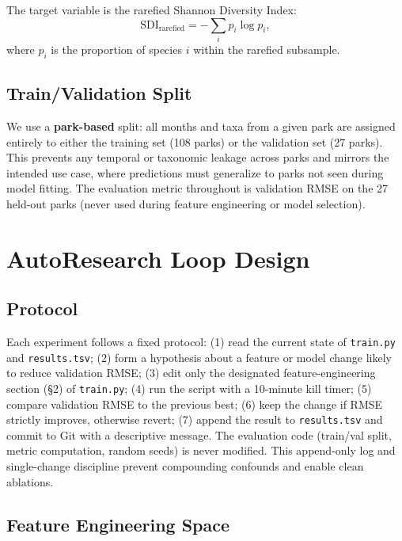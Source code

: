 \documentclass{article}
\begin{document}
The target variable is the rarefied Shannon Diversity Index:
\begin{equation}
  \text{SDI}_{\text{rarefied}} = -\sum_{i} p_{i} \log p_{i},
  \label{eq:sdi}
\end{equation}
where $p_i$ is the proportion of species $i$ within the rarefied
subsample.

\subsection{Train/Validation Split}

We use a \textbf{park-based} split: all months and taxa from a given
park are assigned entirely to either the training set (108 parks) or
the validation set (27 parks). This prevents any temporal or taxonomic
leakage across parks and mirrors the intended use case, where
predictions must generalize to parks not seen during model fitting. The
evaluation metric throughout is validation RMSE on the 27 held-out
parks (never used during feature engineering or model selection).

\section{AutoResearch Loop Design}
\label{sec:loop}

\subsection{Protocol}

Each experiment follows a fixed protocol: (1) read the current state
of \texttt{train.py} and \texttt{results.tsv}; (2) form a hypothesis
about a feature or model change likely to reduce validation RMSE; (3)
edit only the designated feature-engineering section (\S2) of
\texttt{train.py}; (4) run the script with a 10-minute kill timer; (5)
compare validation RMSE to the previous best; (6) keep the change if
RMSE strictly improves, otherwise revert; (7) append the result to
\texttt{results.tsv} and commit to Git with a descriptive message.
The evaluation code (train/val split, metric computation, random seeds)
is never modified. This append-only log and single-change discipline
prevent compounding confounds and enable clean ablations.

\subsection{Feature Engineering Space}
\end{document}
